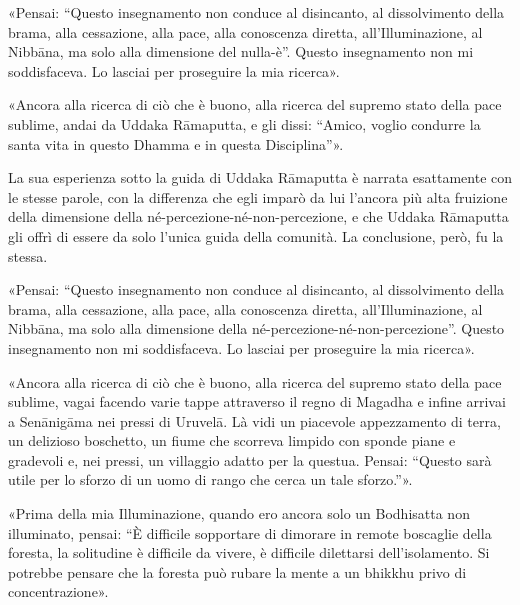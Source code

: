 «Pensai: “Questo insegnamento non conduce al disincanto, al dissolvimento della
brama, alla cessazione, alla pace, alla conoscenza diretta, all’Illuminazione,
al Nibbāna, ma solo alla dimensione del nulla-è”. Questo insegnamento non mi
soddisfaceva. Lo lasciai per proseguire la mia ricerca».

«Ancora alla ricerca di ciò che è buono, alla ricerca del supremo stato della
pace sublime, andai da Uddaka Rāmaputta, e gli dissi: “Amico, voglio condurre la
santa vita in questo Dhamma e in questa Disciplina”».


 La sua esperienza sotto la guida di Uddaka Rāmaputta
è narrata esattamente con le stesse parole, con la differenza che egli imparò da
lui l’ancora più alta fruizione della dimensione della
né-percezione-né-non-percezione, e che Uddaka Rāmaputta gli offrì di essere da
solo l’unica guida della comunità. La conclusione, però, fu la stessa.

 «Pensai: “Questo insegnamento non conduce al disincanto, al
dissolvimento della brama, alla cessazione, alla pace, alla conoscenza diretta,
all’Illuminazione, al Nibbāna, ma solo alla dimensione della
né-percezione-né-non-percezione”. Questo insegnamento non mi soddisfaceva. Lo
lasciai per proseguire la mia ricerca».

«Ancora alla ricerca di ciò che è buono, alla ricerca del supremo stato della
pace sublime, vagai facendo varie tappe attraverso il regno di Magadha e infine
arrivai a Senānigāma nei pressi di Uruvelā. Là vidi un piacevole appezzamento di
terra, un delizioso boschetto, un fiume che scorreva limpido con sponde piane e
gradevoli e, nei pressi, un villaggio adatto per la questua. Pensai: “Questo
sarà utile per lo sforzo di un uomo di rango che cerca un tale sforzo.”».


«Prima della mia Illuminazione, quando ero ancora solo un Bodhisatta non
illuminato, pensai: “È difficile sopportare di dimorare in remote boscaglie
della foresta, la solitudine è difficile da vivere, è difficile dilettarsi
dell’isolamento. Si potrebbe pensare che la foresta può rubare la mente a un
bhikkhu privo di concentrazione».

